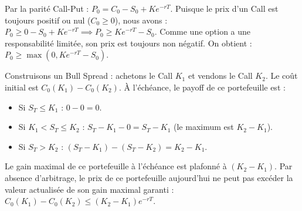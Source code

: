 \begin{correctionbox}
Par la parité Call-Put : $P_0 = C_0 - S_0 + K e^{-rT}$.
Puisque le prix d'un Call est toujours positif ou nul ($C_0 \ge 0$), nous avons :
$P_0 \ge 0 - S_0 + K e^{-rT} \implies P_0 \ge K e^{-rT} - S_0$.
Comme une option a une responsabilité limitée, son prix est toujours non négatif. 
On obtient : $P_0 \ge \max(0, K e^{-rT} - S_0)$.
\end{correctionbox}

\begin{correctionbox}
Construisons un Bull Spread : achetons le Call $K_1$ et vendons le Call $K_2$.
Le coût initial est $C_0(K_1) - C_0(K_2)$.
À l'échéance, le payoff de ce portefeuille est :
\begin{itemize}[label=$\cdot$]
    \item Si $S_T \le K_1$ : $0 - 0 = 0$.
    \item Si $K_1 < S_T \le K_2$ : $S_T - K_1 - 0 = S_T - K_1$ (le maximum est $K_2 - K_1$).
    \item Si $S_T > K_2$ : $(S_T - K_1) - (S_T - K_2) = K_2 - K_1$.
\end{itemize}
Le gain maximal de ce portefeuille à l'échéance est plafonné à $(K_2 - K_1)$.
Par absence d'arbitrage, le prix de ce portefeuille aujourd'hui ne peut pas excéder la valeur actualisée de son gain maximal garanti :
$C_0(K_1) - C_0(K_2) \le (K_2 - K_1)e^{-rT}$.
\end{correctionbox}